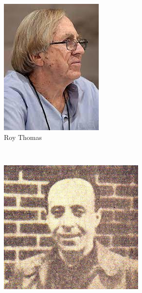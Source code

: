\begin{frame}{}
\begin{figure}[htp]
\begin{subfigure}[b]{0.16\textwidth}
   \includegraphics[width=\textwidth]{img/artistas/RoyThomas}
   \caption{Roy Thomas}
 \end{subfigure}
~
 \begin{subfigure}[b]{0.16\textwidth}
   \includegraphics[width=\textwidth]{img/artistas/SamRosen1964}

\end{subfigure}
\end{figure}
\end{frame}
